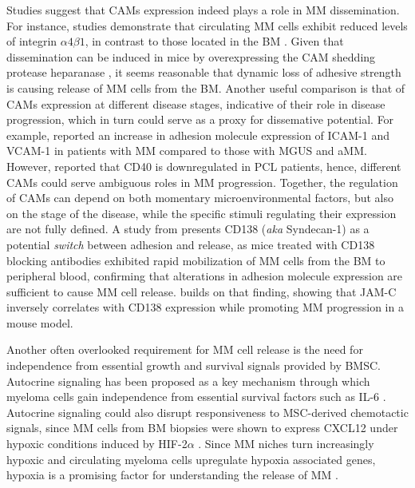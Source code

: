 Studies suggest that \acp{CAM} expression indeed plays a role in \ac{MM}
dissemination. For instance, studies demonstrate that circulating \ac{MM} cells
exhibit reduced levels of integrin $\alpha4\beta1$, in contrast to those located
in the \ac{BM} \cite{paivaDetailedCharacterizationMultiple2013,
    paivaCompetitionClonalPlasma2011}. Given that dissemination can be induced in
mice by overexpressing the \ac{CAM} shedding protease heparanase
\cite{yangHeparanasePromotesSpontaneous2005}, it seems reasonable that dynamic
loss of adhesive strength is causing release of \ac{MM} cells from the \ac{BM}.
Another useful comparison is that of \acp{CAM} expression at different disease
stages, indicative of their role in disease progression, which in turn could
serve as a proxy for dissemative potential. For example,
\citet{terposIncreasedCirculatingVCAM12016}
reported an increase in adhesion molecule expression of ICAM-1 and VCAM-1 in
patients with \ac{MM} compared to those with \ac{MGUS} and \ac{aMM}. However,
\citet{perez-andresClonalPlasmaCells2005} reported that CD40 is downregulated in
\ac{PCL} patients, hence, different \acp{CAM} could serve ambiguous roles in
\ac{MM} progression. Together, the regulation of \acp{CAM} can depend on both
momentary microenvironmental factors, but also on the stage of the disease,
while the specific stimuli regulating their expression are not fully defined. A
study from \citet{akhmetzyanovaDynamicCD138Surface2020} presents CD138
(\textit{aka} Syndecan-1) as a potential \textit{switch} between adhesion and
release, as mice treated with CD138 blocking antibodies exhibited
rapid mobilization of \ac{MM} cells from the \ac{BM} to peripheral blood,
confirming that alterations in adhesion molecule expression are sufficient to
cause \ac{MM} cell release. \citet{brandlJunctionalAdhesionMolecule2022}
builds on that finding, showing that JAM-C inversely correlates with CD138
expression while promoting \ac{MM} progression in a mouse model.


Another often overlooked requirement for \ac{MM} cell release is the need for
independence from essential growth and survival signals provided by \ac{BMSC}.
Autocrine signaling has been proposed as a key mechanism through which myeloma
cells gain independence from essential survival factors such as IL-6
\cite{frassanitoAutocrineInterleukin6Production2001,
    urashimaCD40LigandTriggered1995}. Autocrine signaling could also disrupt
responsiveness to \ac{MSC}-derived chemotactic signals, since \ac{MM} cells from
\ac{BM} biopsies were shown to express CXCL12 under hypoxic conditions induced
by HIF-2$\alpha$ \cite{martinHypoxiainducibleFactor2Novel2010}. Since \ac{MM}
niches turn increasingly hypoxic and circulating myeloma cells upregulate
hypoxia associated genes, hypoxia is a promising factor for understanding the
release of \ac{MM} \cite{garcesTranscriptionalProfilingCirculating2020}.



